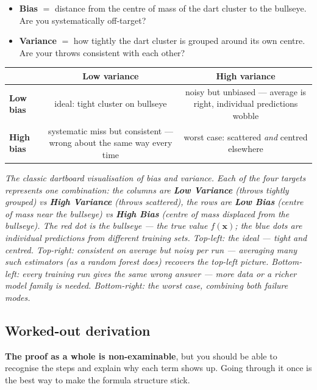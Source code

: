 \documentclass[11pt, a4paper]{article}
\begin{document}
\begin{itemize}
  \item \textbf{Bias} $=$ distance from the centre of mass of the dart cluster to the bullseye. Are you systematically off-target?
  \item \textbf{Variance} $=$ how tightly the dart cluster is grouped around its own centre. Are your throws consistent with each other?
\end{itemize}

\begin{center}
\renewcommand{\arraystretch}{1.4}
\begin{tabular}{l|cc}
& \textbf{Low variance} & \textbf{High variance} \\
\hline
\textbf{Low bias} & ideal: tight cluster on bullseye & noisy but unbiased — average is right, individual predictions wobble \\
\textbf{High bias} & systematic miss but consistent — wrong about the same way every time & worst case: scattered \emph{and} centred elsewhere \\
\end{tabular}
\end{center}

\begin{center}

\footnotesize\textit{The classic dartboard visualisation of bias and variance. Each of the four targets represents one combination: the columns are \textbf{Low Variance} (throws tightly grouped) vs \textbf{High Variance} (throws scattered), the rows are \textbf{Low Bias} (centre of mass near the bullseye) vs \textbf{High Bias} (centre of mass displaced from the bullseye). The red dot is the bullseye --- the true value $f(\mathbf{x})$; the blue dots are individual predictions from different training sets. \emph{Top-left}: the ideal --- tight and centred. \emph{Top-right}: consistent on average but noisy per run --- averaging many such estimators (as a random forest does) recovers the top-left picture. \emph{Bottom-left}: every training run gives the same wrong answer --- more data or a richer model family is needed. \emph{Bottom-right}: the worst case, combining both failure modes.}
\end{center}

\subsection{Worked-out derivation}

\textbf{The proof as a whole is non-examinable}, but you should be able to recognise the steps and explain why each term shows up. Going through it once is the best way to make the formula structure stick.
\end{document}

